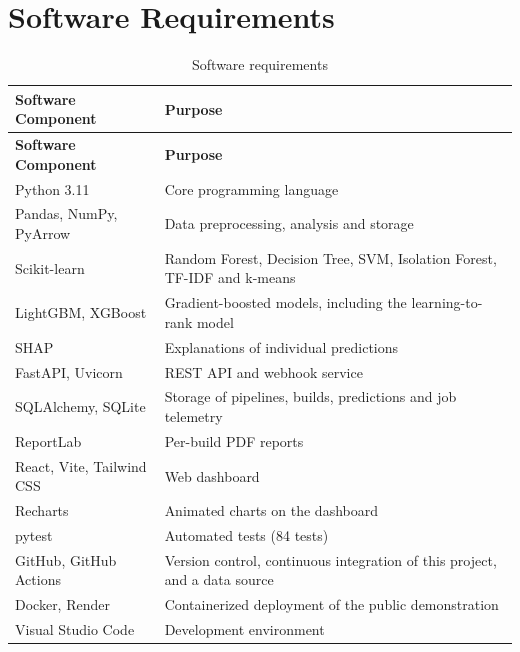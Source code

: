 \section{Software Requirements}
\label{sec:software}
\begin{longtable}{|p{4.6cm}|p{8.4cm}|}
\caption{Software requirements}\label{tab:sw}\\
\hline
\textbf{Software Component} & \textbf{Purpose}\\ \hline
\endfirsthead
\hline
\textbf{Software Component} & \textbf{Purpose}\\ \hline
\endhead
Python 3.11 & Core programming language\\ \hline
Pandas, NumPy, PyArrow & Data preprocessing, analysis and storage\\ \hline
Scikit-learn & Random Forest, Decision Tree, SVM, Isolation Forest, TF-IDF and k-means\\ \hline
LightGBM, XGBoost & Gradient-boosted models, including the learning-to-rank model\\ \hline
SHAP & Explanations of individual predictions\\ \hline
FastAPI, Uvicorn & REST API and webhook service\\ \hline
SQLAlchemy, SQLite & Storage of pipelines, builds, predictions and job telemetry\\ \hline
ReportLab & Per-build PDF reports\\ \hline
React, Vite, Tailwind CSS & Web dashboard\\ \hline
Recharts & Animated charts on the dashboard\\ \hline
pytest & Automated tests (84 tests)\\ \hline
GitHub, GitHub Actions & Version control, continuous integration of this project, and a data source\\ \hline
Docker, Render & Containerized deployment of the public demonstration\\ \hline
Visual Studio Code & Development environment\\ \hline
\end{longtable}
